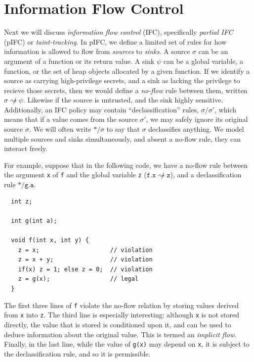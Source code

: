 \documentclass{article}
\begin{document}
\section{Information Flow Control}

Next we will discuss {\em information flow control} (IFC), specifically {\em partial IFC} (pIFC)
or {\em taint-tracking}. In pIFC, we define a limited set of rules for how information is allowed
to flow from {\em sources} to {\em sinks}. A source \(\sigma\) can be an argument of a function or
its return value. A sink \(\psi\) can be a global variable, a function, or the set of heap objects
allocated by a given function. If we identify a source as carrying high-privilege secrets,
and a sink as lacking the privilege to recieve those secrets, then we would define a {\em no-flow}
rule between them, written \(\sigma \not \rightsquigarrow \psi\).
Likewise if the source is untrusted, and the sink highly sensitive.
Additionally, an IFC policy may contain ``declassification'' rules, \(\sigma / \sigma'\), which
means that if a value comes from the source \(\sigma'\), we may safely ignore its original source
\(\sigma\). We will often write \(* / \sigma\) to say that \(\sigma\) declassifies anything.
We model multiple sources and sinks simultaneously, and absent a no-flow rule, they
can interact freely.

For example, suppose that in the following code, we have a no-flow rule between
the argument {\tt x} of {\tt f} and the global variable {\tt z}
(\(\mathtt{f.x} \not \rightsquigarrow \mathtt{z}\)), and a declassification rule
\(* / \mathtt{g.a}\).

\begin{verbatim}
  int z;

  int g(int a);

  void f(int x, int y) {
    z = x;                    // violation
    z = x + y;                // violation
    if(x) z = 1; else z = 0;  // violation
    z = g(x);                 // legal
  }
\end{verbatim}

The first three lines of {\tt f} violate the no-flow relation by storing values derived from
{\tt x} into {\tt z}. The third line is especially interesting: although {\tt x} is not stored
directly, the value that is stored is conditioned upon it, and can be used to deduce information
about the original value. This is termed an {\em implicit flow}. Finally, in the last line,
while the value of {\tt g(x)} may depend on {\tt x}, it is subject to the declassification rule,
and so it is permissible.
\end{document}
